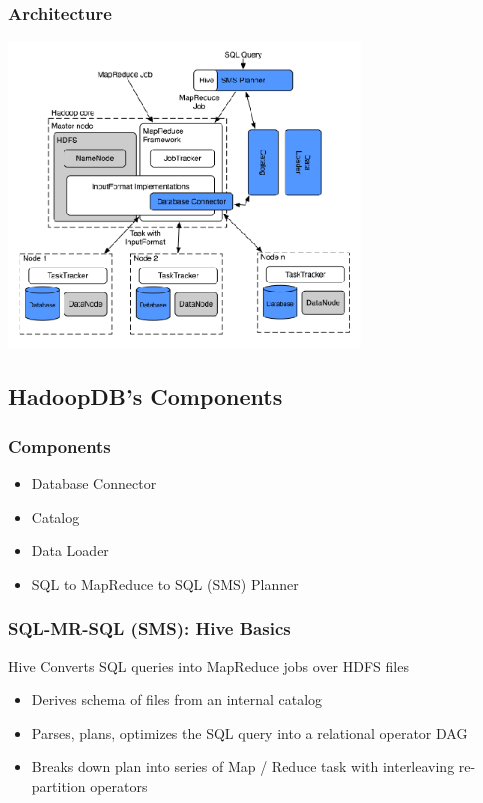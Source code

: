 \documentclass{beamer}
\begin{document}
\begin{frame}
  \frametitle{Architecture}
      \begin{center}
      \includegraphics[width=0.7\textwidth]{Architecture}
    \end{center}
\end{frame}

\subsection{HadoopDB's Components}
\begin{frame}
  \frametitle{Components}
  \begin{itemize}
  \item Database Connector
  \item Catalog
  \item Data Loader
  \item SQL to MapReduce to SQL (SMS) Planner
  \end{itemize}
\end{frame}

\begin{frame}
  \frametitle{SQL-MR-SQL (SMS): Hive Basics}
  Hive Converts SQL queries into MapReduce jobs over HDFS files
  \begin{itemize}
  \item Derives schema of files from an internal catalog
  \item Parses, plans, optimizes the SQL query into a relational
    operator DAG
  \item Breaks down plan into series of Map / Reduce task with
    interleaving re-partition operators
  \end{itemize}
\end{frame}
\end{document}
